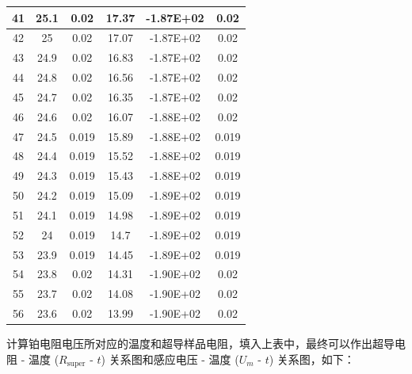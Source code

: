 \documentclass{THUexprep}
\begin{document}
\begin{longtable}{|c|c|c|c|c|c|}
    \hline
    41    & 25.1  & 0.02  & 17.37 & -1.87E+02 & 0.02 \\
    \hline
    42    & 25    & 0.02  & 17.07 & -1.87E+02 & 0.02 \\
    \hline
    43    & 24.9  & 0.02  & 16.83 & -1.87E+02 & 0.02 \\
    \hline
    44    & 24.8  & 0.02  & 16.56 & -1.87E+02 & 0.02 \\
    \hline
    45    & 24.7  & 0.02  & 16.35 & -1.87E+02 & 0.02 \\
    \hline
    46    & 24.6  & 0.02  & 16.07 & -1.88E+02 & 0.02 \\
    \hline
    47    & 24.5  & 0.019 & 15.89 & -1.88E+02 & 0.019 \\
    \hline
    48    & 24.4  & 0.019 & 15.52 & -1.88E+02 & 0.019 \\
    \hline
    49    & 24.3  & 0.019 & 15.43 & -1.88E+02 & 0.019 \\
    \hline
    50    & 24.2  & 0.019 & 15.09 & -1.89E+02 & 0.019 \\
    \hline
    51    & 24.1  & 0.019 & 14.98 & -1.89E+02 & 0.019 \\
    \hline
    52    & 24    & 0.019 & 14.7  & -1.89E+02 & 0.019 \\
    \hline
    53    & 23.9  & 0.019 & 14.45 & -1.89E+02 & 0.019 \\
    \hline
    54    & 23.8  & 0.02  & 14.31 & -1.90E+02 & 0.02 \\
    \hline
    55    & 23.7  & 0.02  & 14.08 & -1.90E+02 & 0.02 \\
    \hline
    56    & 23.6  & 0.02  & 13.99 & -1.90E+02 & 0.02 \\
    \hline
\end{longtable}

计算铂电阻电压所对应的温度和超导样品电阻，填入上表中，最终可以作出超导电阻 - 温度 ($R_\text{super}$ - $t$) 关系图和感应电压 - 温度 ($U_m$ - $t$) 关系图，如下：
\end{document}
